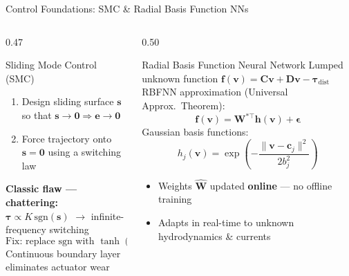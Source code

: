 \documentclass[aspectratio=169,10pt]{beamer}
\begin{document}
\begin{frame}{Control Foundations: SMC \& Radial Basis Function NNs}

\begin{columns}[T]
\begin{column}{0.47\textwidth}
  \begin{block}{Sliding Mode Control (SMC)}
    \begin{enumerate}\small
      \item Design sliding surface $\mathbf{s}$ so that $\mathbf{s}\to\mathbf{0}\Rightarrow \mathbf{e}\to\mathbf{0}$
      \item Force trajectory onto $\mathbf{s}=\mathbf{0}$ using a switching law
    \end{enumerate}
    \vspace{4pt}
    \textbf{Classic flaw — chattering:}\\
    $\bm{\tau} \propto K\,\text{sgn}(\mathbf{s})$ $\to$ infinite-frequency switching
    \[
      \boxed{\text{Fix: replace sgn with }\tanh(\mathbf{s}/\phi)}
    \]
    Continuous boundary layer eliminates actuator wear
  \end{block}
\end{column}
\begin{column}{0.50\textwidth}
  \begin{block}{Radial Basis Function Neural Network}
    Lumped unknown function $\mathbf{f}(\mathbf{v}) = \mathbf{C}\mathbf{v}+\mathbf{D}\mathbf{v}-\bm{\tau}_\text{dist}$\\[4pt]
    RBFNN approximation (Universal Approx.\ Theorem):
    \[
      \mathbf{f}(\mathbf{v}) = \mathbf{W}^{*\top}\mathbf{h}(\mathbf{v}) + \bm{\epsilon}
    \]
    Gaussian basis functions:
    \[
      h_j(\mathbf{v}) = \exp\!\left(-\frac{\|\mathbf{v}-\mathbf{c}_j\|^2}{2b_j^2}\right)
    \]
    \begin{itemize}\small
      \item Weights $\hat{\mathbf{W}}$ updated \textbf{online} — no offline training
      \item Adapts in real-time to unknown hydrodynamics \& currents
    \end{itemize}
  \end{block}
\end{column}
\end{columns}
\end{frame}
\end{document}
